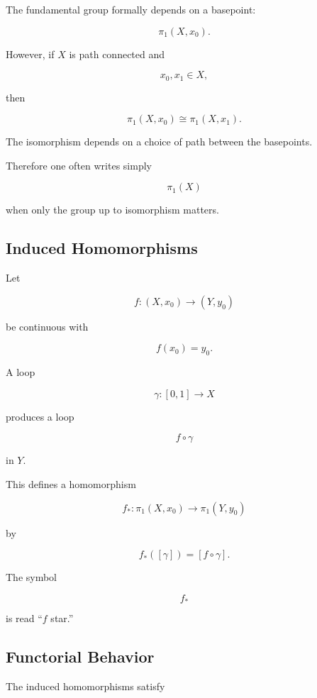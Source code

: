 The fundamental group formally depends on a basepoint:

\[
\pi_1(X,x_0).
\]

However, if \(X\) is path connected and

\[
x_0,x_1\in X,
\]

then

\[
\boxed{
\pi_1(X,x_0)
\cong
\pi_1(X,x_1).
}
\]

The isomorphism depends on a choice of path between the basepoints.

Therefore one often writes simply

\[
\pi_1(X)
\]

when only the group up to isomorphism matters.

\subsection{Induced Homomorphisms}
\label{subsec:induced-homomorphisms-pi1}

Let

\[
f:(X,x_0)\to(Y,y_0)
\]

be continuous with

\[
f(x_0)=y_0.
\]

A loop

\[
\gamma:[0,1]\to X
\]

produces a loop

\[
f\circ\gamma
\]

in \(Y\).

This defines a homomorphism

\[
\boxed{
f_*:
\pi_1(X,x_0)
\to
\pi_1(Y,y_0)
}
\]

by

\[
\boxed{
f_*([\gamma])
=
[f\circ\gamma].
}
\]

The symbol

\[
f_*
\]

is read ``\(f\) star.''

\subsection{Functorial Behavior}
\label{subsec:fundamental-group-functoriality}

The induced homomorphisms satisfy


